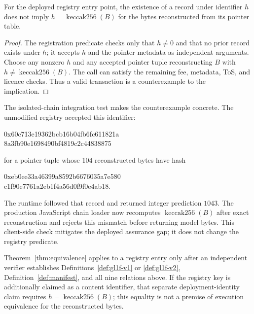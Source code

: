 \begin{proposition}
\label{prop:no-binding}
For the deployed registry entry point, the existence of a record under
identifier $h$ does not imply
$h=\operatorname{keccak256}(B)$ for the bytes reconstructed from its pointer
table.
\end{proposition}

\begin{proof}
The registration predicate checks only that $h\ne0$ and that no prior record
exists under $h$; it accepts $h$ and the pointer metadata as independent
arguments.  Choose any nonzero $h$ and any accepted pointer tuple reconstructing
$B$ with $h\ne\operatorname{keccak256}(B)$.  The call can satisfy the remaining
fee, metadata, ToS, and licence checks.  Thus a valid transaction is a
counterexample to the implication.
\end{proof}

\begin{remark}
The isolated-chain integration test makes the counterexample concrete.  The
unmodified registry accepted this identifier:
\begin{center}
\small\ttfamily
0x60c713e19362bcb16b04fb6fc611821a\\
8a3fb90e1698490bf4819c2c44838875
\end{center}
for a pointer tuple whose 104 reconstructed bytes have hash
\begin{center}
\small\ttfamily
0xeb0ee33a46399a8592b6676035a7e580\\
c1f90e7761a2eb1f4a56d0f9f0e4ab18.
\end{center}
The runtime followed that record and returned integer prediction $1043$.
The production JavaScript chain loader now recomputes
$\operatorname{keccak256}(B)$ after exact reconstruction and rejects this
mismatch before returning model bytes.  This client-side check mitigates the
deployed assurance gap; it does not change the registry predicate.
\end{remark}

\begin{corollary}
Theorem~\ref{thm:equivalence} applies to a registry entry only after an
independent verifier establishes Definitions~\ref{def:gl1f-v1} or
\ref{def:gl1f-v2}, Definition~\ref{def:manifest}, and all nine relations above.
If the registry key is additionally claimed as a content identifier, that
separate deployment-identity claim requires
$h=\operatorname{keccak256}(B)$; this equality is not a premise of execution
equivalence for the reconstructed bytes.
\end{corollary}

